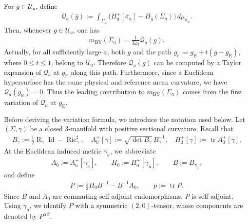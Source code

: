 \documentclass[10pt,a4paper]{amsart}
\newcommand{\gE}{g_{\mathrm{E}}}
\newcommand{\tr}{\operatorname{tr}}
\newcommand{\Ric}{\operatorname{Ric}}
\newcommand{\Id}{\operatorname{Id}}
\newcommand{\Scal}{\operatorname{R}}
\newcommand{\BY}{\mathrm{BY}}
\begin{document}
	For
	$\bar g\in\mathcal U_a$, define
	\begin{align}
		\mathcal Q_a(\bar g)
		:=
		\int_{\Sigma_a}
		\bigl(
		H_0^+[\bar\sigma_a]
		-
		H_{\bar g}(\Sigma_a)
		\bigr)
		\,d\mu_{\bar\sigma_a}.
	\end{align}
	Then, whenever $g\in\mathcal U_a$, one has
	\begin{align*}
		m_{\BY}(\Sigma_a)
		=
		\frac{1}{3\omega_3}\mathcal Q_a(g).
	\end{align*}
	Actually, for all sufficiently large $a$, both $g$ and
	the path $g_t:=\gE+t(g-\gE)$, where $0\leq t\leq 1$, belong to $\mathcal U_a$. Therefore $\mathcal Q_a(g)$ can be computed by a
	Taylor expansion of $\mathcal Q_a$ at $\gE$ along this path. Furthermore, since a Euclidean hypersurface has the same physical and reference mean
	curvature, we have $\mathcal Q_a(\gE)=0$. Thus the leading contribution to $m_{\BY}(\Sigma_a)$ comes from the first
	variation of $\mathcal Q_a$ at $\gE$.
	
	Before deriving the variation formula, we introduce the notation used below.
	Let $(\Sigma,\gamma)$ be a closed $3$-manifold with positive sectional
	curvature. Recall that
	\begin{align*}
		B_\gamma
		:=
		\frac12\Scal_\gamma\Id-\Ric_\gamma^\sharp,
		\quad
		A_0^+[\gamma]
		:=
		\sqrt{\det B_\gamma}\,B_\gamma^{-1},
		\quad H_0^+[\gamma]
		:=
		\tr A_0^+[\gamma].
	\end{align*}
	At the Euclidean induced metric $\gamma_a$, we abbreviate
	\begin{align*}
		A_0:=A_0^+[\gamma_a],
		\qquad
		H_0:=H_0^+[\gamma_a],
		\qquad
		B:=B_{\gamma_a},
	\end{align*}
	and define
	\begin{align*}
		P
		:=
		\frac12H_0B^{-1}-B^{-1}A_0,
		\qquad
		p:=\tr P.
	\end{align*}
	Since $B$ and $A_0$ are commuting self-adjoint endomorphisms, $P$ is
	self-adjoint. Using $\gamma_a$, we identify $P$ with a symmetric
	$(2,0)$-tensor, whose components are denoted by $P^{\alpha\beta}$.
	
\end{document}
